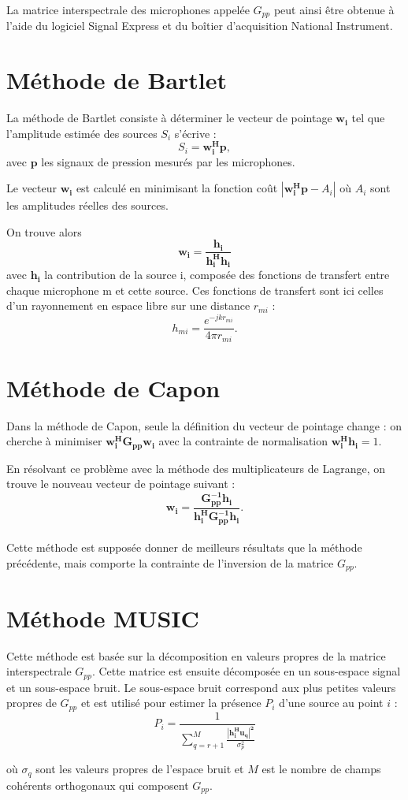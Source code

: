 \documentclass[a4paper]{article}
\renewcommand{\b}[1]{\boldsymbol{#1}}
\begin{document}
La matrice interspectrale des microphones appelée $G_{pp}$ peut ainsi être obtenue à l'aide du logiciel Signal Express et du boîtier d'acquisition National Instrument.



\section{Méthode de Bartlet}

La méthode de Bartlet consiste à déterminer le vecteur de pointage $\b{w_i}$ tel que l'amplitude estimée des sources $S_i$ s'écrive : $$S_i=\b{w_{i}^{H}p},$$ avec $\b{p}$ les signaux de pression mesurés par les microphones.

Le vecteur $\b{w_i}$ est calculé en minimisant la fonction coût $|\b{w_{i}^{H}p}-A_i|$ où $A_{i}$ sont les amplitudes réelles des sources.

On trouve alors $$\b{w_{i}}=\b{\frac{h_i}{h_{i}^{H}h_{i}}}$$ avec $\b{h_i}$ la contribution de la source i, composée des fonctions de transfert entre chaque microphone m et cette source. Ces fonctions de transfert sont ici celles d'un rayonnement en espace libre sur une distance $r_{mi}$ : $$ h_{mi}=\frac{e^{-jkr_{mi}}}{4\pi r_{mi}}.$$


\section{Méthode de Capon}

Dans la méthode de Capon, seule la définition du vecteur de pointage change : on cherche à minimiser $\b{w_{i}^{H}G_{pp}w_{i}}$ avec la contrainte de normalisation $\b{w_{i}^{H}h_i}=1$. 

En résolvant ce problème avec la méthode des multiplicateurs de Lagrange, on trouve le nouveau vecteur de pointage suivant : $$\b{w_i=\frac{G_{pp}^{-1}h_{i}}{h_{i}^{H}G_{pp}^{-1}h_{i}}}.$$\\

Cette méthode est supposée donner de meilleurs résultats que la méthode précédente, mais comporte la contrainte de l'inversion de la matrice $G_{pp}$.

\section{Méthode MUSIC}

Cette méthode est basée sur la décomposition en valeurs propres de la matrice interspectrale $G_{pp}$. Cette matrice est ensuite décomposée en un sous-espace signal et un sous-espace bruit. Le sous-espace bruit correspond aux plus petites valeurs propres de $G_{pp}$ et est utilisé pour estimer la présence $P_i$ d'une source au point $i$ :
 \begin{equation}
 P_i = \frac{1}{\sum \limits_{q=r+1}^{M} \frac{\b{\left|h_{i}^{H}u_q\right|^{2}}}{\sigma_{p}^{2}}}
\end{equation}

où $\sigma_q$ sont les valeurs propres de l'espace bruit et $M$ est le nombre de champs cohérents orthogonaux qui composent $G_{pp}$.
\end{document}
